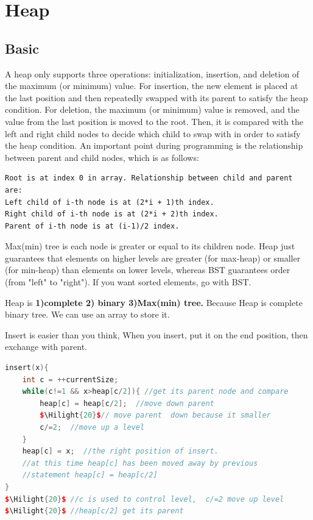 \documentclass[a4paper,11pt,twoside]{book}
\newcommand{\Hilight}[1]{\makebox[0pt][l]{\color{yellow}\rule[-3pt]{#1em}{11pt}}}
\begin{document}
\section{Heap}
\subsection{Basic}


\par A heap only supports three operations: initialization, insertion, and deletion of the maximum (or minimum) value. For insertion, the new element is placed at the last position and then repeatedly swapped with its parent to satisfy the heap condition. For deletion, the maximum (or minimum) value is removed, and the value from the last position is moved to the root. Then, it is compared with the left and right child nodes to decide which child to swap with in order to satisfy the heap condition. An important point during programming is the relationship between parent and child nodes, which is as follows:
\begin{lstlisting}
Root is at index 0 in array. Relationship between child and parent are:
Left child of i-th node is at (2*i + 1)th index.
Right child of i-th node is at (2*i + 2)th index.
Parent of i-th node is at (i-1)/2 index.	
\end{lstlisting}

	
\par Max(min) tree is each node is greater or equal to its children node. Heap just guarantees that elements on higher levels are greater (for max-heap) or smaller (for min-heap) than elements on lower levels, whereas BST guarantees order (from "left" to "right"). If you want sorted elements, go with BST.



\par Heap is \textbf{1)complete 2) binary 3)Max(min) tree.} Because Heap is complete binary tree. We can use an array to store it. 

\par Insert is easier than you think, When you insert, put it on the end position, then exchange with parent.  
\begin{lstlisting}[frame=single, language=c++, mathescape=true]
insert(x){
	int c = ++currentSize;
	while(c!=1 && x>heap[c/2]){ //get its parent node and compare
		heap[c] = heap[c/2];  //move down parent
		$\Hilight{20}$// move parent  down because it smaller
		c/=2;  //move up a level 
	}  
	heap[c] = x;  //the right position of insert. 
	//at this time heap[c] has been moved away by previous 
	//statement heap[c] = heap[c/2] 
}
$\Hilight{20}$ //c is used to control level,  c/=2 move up level
$\Hilight{20}$ //heap[c/2] get its parent	
\end{lstlisting}
\end{document}

